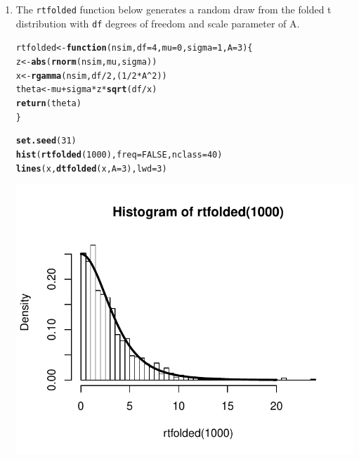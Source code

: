 \documentclass[12pt]{article}\usepackage[]{graphicx}\usepackage[]{color}
\makeatletter
\newcommand{\hlnum}[1]{\textcolor[rgb]{0.686,0.059,0.569}{#1}}%
\newcommand{\hlopt}[1]{\textcolor[rgb]{0,0,0}{#1}}%
\newcommand{\hlstd}[1]{\textcolor[rgb]{0.345,0.345,0.345}{#1}}%
\newcommand{\hlkwa}[1]{\textcolor[rgb]{0.161,0.373,0.58}{\textbf{#1}}}%
\newcommand{\hlkwb}[1]{\textcolor[rgb]{0.69,0.353,0.396}{#1}}%
\newcommand{\hlkwc}[1]{\textcolor[rgb]{0.333,0.667,0.333}{#1}}%
\newcommand{\hlkwd}[1]{\textcolor[rgb]{0.737,0.353,0.396}{\textbf{#1}}}%
\newenvironment{kframe}{%
 \def\at@end@of@kframe{}%
 \ifinner\ifhmode%
  \def\at@end@of@kframe{\end{minipage}}%
  \begin{minipage}{\columnwidth}%
 \fi\fi%
 \def\FrameCommand##1{\hskip\@totalleftmargin \hskip-\fboxsep
 \colorbox{shadecolor}{##1}\hskip-\fboxsep
     \hskip-\linewidth \hskip-\@totalleftmargin \hskip\columnwidth}%
 \MakeFramed {\advance\hsize-\width
   \@totalleftmargin\z@ \linewidth\hsize
   \@setminipage}}%
 {\par\unskip\endMakeFramed%
 \at@end@of@kframe}
\newenvironment{knitrout}{}{} %
\makeatother
\begin{document}
\begin{doublespacing}
\begin{enumerate}
\begin{enumerate}
\begin{enumerate}
\begin{center}
\begin{singlespace}
\begin{knitrout}
\end{knitrout}
\end{singlespace}
\end{center}

\item The \verb+rtfolded+ function below generates a random draw from the folded t distribution with \verb+df+ degrees of freedom and scale parameter of A. 
\begin{singlespace}
\begin{center}
\begin{knitrout}\footnotesize
{}\color{fgcolor}\begin{kframe}
\begin{alltt}
\hlstd{rtfolded} \hlkwb{<-} \hlkwa{function}\hlstd{(}\hlkwc{nsim}\hlstd{,} \hlkwc{df}\hlstd{=}\hlnum{4}\hlstd{,} \hlkwc{mu}\hlstd{=}\hlnum{0}\hlstd{,} \hlkwc{sigma}\hlstd{=}\hlnum{1}\hlstd{,} \hlkwc{A}\hlstd{=}\hlnum{3}\hlstd{)\{}
  \hlstd{z} \hlkwb{<-} \hlkwd{abs}\hlstd{(}\hlkwd{rnorm}\hlstd{(nsim, mu, sigma))}
  \hlstd{x} \hlkwb{<-} \hlkwd{rgamma}\hlstd{(nsim, df}\hlopt{/}\hlnum{2}\hlstd{, (}\hlnum{1}\hlopt{/}\hlnum{2}\hlopt{*}\hlstd{A}\hlopt{^}\hlnum{2}\hlstd{))}
  \hlstd{theta} \hlkwb{<-} \hlstd{mu}\hlopt{+}\hlstd{sigma}\hlopt{*}\hlstd{z}\hlopt{*}\hlkwd{sqrt}\hlstd{(df}\hlopt{/}\hlstd{x)}
  \hlkwd{return}\hlstd{(theta)}
\hlstd{\}}

\hlkwd{set.seed}\hlstd{(}\hlnum{31}\hlstd{)}
\hlkwd{hist}\hlstd{(}\hlkwd{rtfolded}\hlstd{(}\hlnum{1000}\hlstd{),} \hlkwc{freq}\hlstd{=}\hlnum{FALSE}\hlstd{,} \hlkwc{nclass}\hlstd{=}\hlnum{40}\hlstd{)}
\hlkwd{lines}\hlstd{(x,} \hlkwd{dtfolded}\hlstd{(x,} \hlkwc{A}\hlstd{=}\hlnum{3}\hlstd{),} \hlkwc{lwd}\hlstd{=}\hlnum{3}\hlstd{)}
\end{alltt}
\end{kframe}
\includegraphics[width=.5\linewidth]{figure/randomdrawsfoldedt} 

\end{knitrout}
\end{center}
\end{singlespace}


\end{enumerate}
\end{enumerate}
\end{enumerate}
\end{doublespacing}
\end{document}
